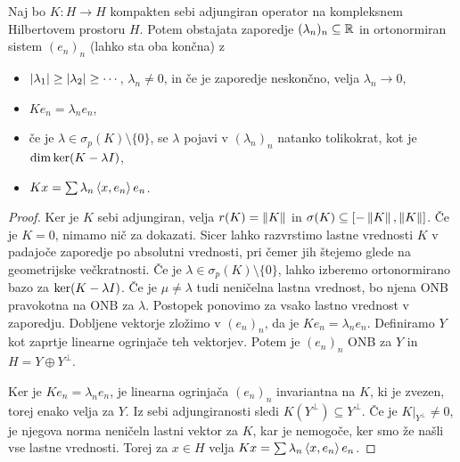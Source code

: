 
\begin{izrek}
  Naj bo $K: H \to H$ kompakten sebi adjungiran operator na kompleksnem
  Hilbertovem prostoru $H$.
  Potem obstajata zaporedje $(\lambda_n)_n \subseteq \mathbb{R}$ in ortonormiran sistem
  $(e_n)_n$ (lahko sta oba končna) z
  \begin{itemize}
  \item $\left| \lambda_1 \right| \ge \left| \lambda_2 \right| \ge \cdots$, $\lambda_n \ne 0$, in
	če je zaporedje neskončno, velja $\lambda_n \to 0$,
  \item $K e_n = \lambda_n e_n$,
  \item če je $\lambda \in \sigma_p(K) \setminus \{0\}$, se $\lambda$ pojavi v
	$(\lambda_n)_n$ natanko tolikokrat, kot je $\dim \operatorname{ker} (K - \lambda I)$,
  \item $Kx = \sum \lambda_n \left< x, e_n \right> e_n$.
  \end{itemize}
\end{izrek}

\begin{proof}
  Ker je $K$ sebi adjungiran, velja $r(K) = \left\lVert K\right\rVert$ in $\sigma(K) \subseteq
  [-\left\lVert K\right\rVert, \left\lVert K\right\rVert]$.
  Če je $K = 0$, nimamo nič za dokazati.
  Sicer lahko razvrstimo lastne vrednosti $K$ v padajoče zaporedje po absolutni
  vrednosti, pri čemer jih štejemo glede na geometrijske večkratnosti.
  Če je $\lambda \in \sigma_p(K) \setminus \{0\}$, lahko izberemo ortonormirano
  bazo za $\operatorname{ker} (K - \lambda I)$.
  Če je $\mu \ne \lambda$ tudi neničelna lastna vrednost, bo njena ONB
  pravokotna na ONB za $\lambda$.
  Postopek ponovimo za vsako lastno vrednost v zaporedju.
  Dobljene vektorje zložimo v $(e_n)_n$, da je $K e_n = \lambda_n e_n$.
  Definiramo $Y$ kot zaprtje linearne ogrinjače teh vektorjev.
  Potem je $(e_n)_n$ ONB za $Y$ in $H = Y \oplus Y^\bot$.

  Ker je $K e_n = \lambda_n e_n$, je linearna ogrinjača $(e_n)_n$ invariantna na
  $K$, ki je zvezen, torej enako velja za $Y$.
  Iz sebi adjungiranosti sledi $K(Y^\bot) \subseteq Y^\bot$.
  Če je $\left. K \right|_{Y^\bot} \ne 0$, je njegova norma neničeln lastni
  vektor za $K$, kar je nemogoče, ker smo že našli vse lastne vrednosti.
  Torej za $x \in H$ velja $Kx = \sum \lambda_n \left< x, e_n \right> e_n$.
\end{proof}


